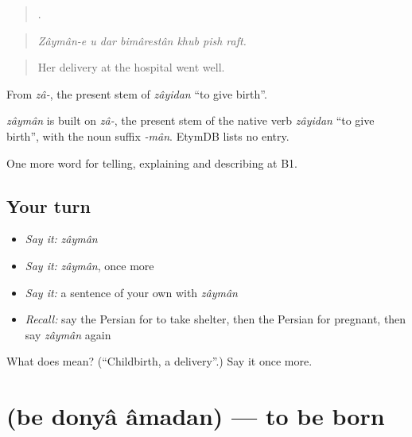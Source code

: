 \begin{quote}
      .
\end{quote}

\begin{quote}
\emph{Zâymân-e u dar bimârestân khub pish raft.}
\end{quote}

\begin{quote}
Her delivery at the hospital went well.
\end{quote}

From \emph{zâ-}, the present stem of \emph{zâyidan} \textquotedblleft{}to give birth\textquotedblright{}.

\begin{cousinweb}
\emph{zâymân} is built on \emph{zâ-}, the present stem of the native verb \emph{zâyidan} \textquotedblleft{}to give birth\textquotedblright{}, with the noun suffix \emph{-mân}. EtymDB lists no entry.
\end{cousinweb}

\begin{grammarlens}[title={What you've built}]
One more word for telling, explaining and describing at B1.
\end{grammarlens}

\subsection*{Your turn}
\begin{itemize}
\raggedright
  \item \emph{Say it:} \emph{zâymân}
  \item \emph{Say it:} \emph{zâymân}, once more
  \item \emph{Say it:} a sentence of your own with \emph{zâymân}
  \item \emph{Recall:} say the Persian for to take shelter, then the Persian for pregnant, then say \emph{zâymân} again
\end{itemize}

\begin{tcolorbox}[breakable,colback=teal!4,colframe=teal!35!black,title={Before you move on}]
What does  mean? (\textquotedblleft{}Childbirth, a delivery\textquotedblright{}.) Say it once more.
\end{tcolorbox}
\section[\texorpdfstring{\fa{به} \fa{دنیا} \fa{آمدن} (be donyâ âmadan)}{به دنیا آمدن (be donyâ âmadan)}]{   (be donyâ âmadan) — to be born}


